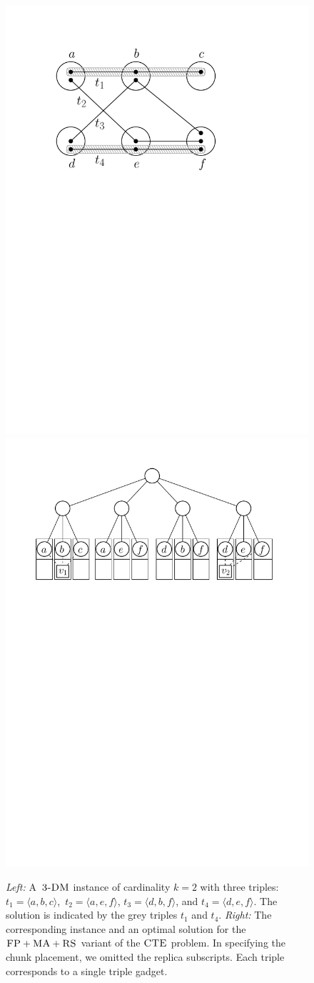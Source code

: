 \begin{figure}[t]
  \centering
\includegraphics[width = 0.31\columnwidth]{figs/static-mapping/tdp-example}
\hspace{1cm}
\centering
\includegraphics[width = 0.55\columnwidth]{figs/static-mapping/cte-ma}
\hfill
\caption{\textit{Left:} A~$\textsc{3-DM}$ instance of cardinality $k=2$ with three triples:
$t_1 = \langle a, b, c \rangle$,~$t_2 = \langle a, e, f \rangle$, $t_3 = \langle d, b, f \rangle$, and $t_4 = \langle d, e, f \rangle$. The solution is
indicated by the grey triples $t_1$ and $t_4$. \textit{Right:} The corresponding instance and an optimal solution for the~$\textsc{FP} + \textsc{MA}
+ \textsc{RS}$ variant of the $\textsc{CTE}$ problem. In specifying the chunk placement, we omitted the replica subscripts. Each triple corresponds to a single triple gadget.}
\hfill
\label{fig:fprsma}
\end{figure}

